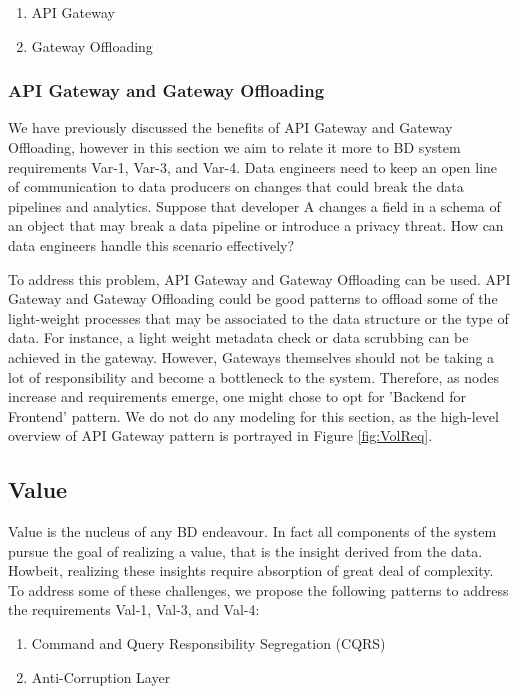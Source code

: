\documentclass{bmcart}
\begin{document}
\begin{enumerate}
  \item API Gateway
  \item Gateway Offloading
\end{enumerate}


\subsubsection{API Gateway and Gateway Offloading}

We have previously discussed the benefits of API Gateway and Gateway Offloading, however in this section we aim to relate it more to BD system requirements Var-1, Var-3, and Var-4. Data engineers need to keep an open line of communication to data producers on changes that could break the data pipelines and analytics. Suppose that developer A changes a field in a schema of an object that may break a data pipeline or introduce a privacy threat. How can data engineers handle this scenario effectively? 

To address this problem, API Gateway and Gateway Offloading can be used. API Gateway and Gateway Offloading could be good patterns to offload some of the light-weight processes that may be associated to the data structure or the type of data. For instance, a light weight metadata check or data scrubbing can be achieved in the gateway. However, Gateways themselves should not be taking a lot of responsibility and become a bottleneck to the system. Therefore, as nodes increase and requirements emerge, one might chose to opt for 'Backend for Frontend' pattern. We do not do any modeling for this section, as the high-level overview of API Gateway pattern is portrayed in Figure \ref{fig:VolReq}.

\subsection{Value}

Value is the nucleus of any BD endeavour. In fact all components of the system pursue the goal of realizing a value, that is the insight derived from the data. Howbeit, realizing these insights require absorption of great deal of complexity. To address some of these challenges, we propose the following patterns to address the requirements Val-1, Val-3, and Val-4:

\begin{enumerate}
  \item Command and Query Responsibility Segregation (CQRS)
  \item  Anti-Corruption Layer
\end{enumerate}
\end{document}
